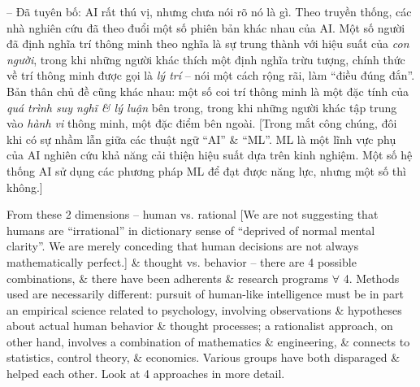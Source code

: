 \documentclass{article}
\begin{document}
\begin{itemize}
\begin{itemize}
\begin{itemize}
			-- Đã tuyên bố: AI rất thú vị, nhưng chưa nói rõ nó là gì. Theo truyền thống, các nhà nghiên cứu đã theo đuổi một số phiên bản khác nhau của AI. Một số người đã định nghĩa trí thông minh theo nghĩa là sự trung thành với hiệu suất của {\it con người}, trong khi những người khác thích một định nghĩa trừu tượng, chính thức về trí thông minh được gọi là {\it lý trí} -- nói một cách rộng rãi, làm ``điều đúng đắn''. Bản thân chủ đề cũng khác nhau: một số coi trí thông minh là một đặc tính của {\it quá trình suy nghĩ \& lý luận} bên trong, trong khi những người khác tập trung vào {\it hành vi} thông minh, một đặc điểm bên ngoài. [Trong mắt công chúng, đôi khi có sự nhầm lẫn giữa các thuật ngữ ``AI'' \& ``ML''. ML là một lĩnh vực phụ của AI nghiên cứu khả năng cải thiện hiệu suất dựa trên kinh nghiệm. Một số hệ thống AI sử dụng các phương pháp ML để đạt được năng lực, nhưng một số thì không.]
			
			From these 2 dimensions -- human vs. rational [We are not suggesting that humans are ``irrational'' in dictionary sense of ``deprived of normal mental clarity''. We are merely conceding that human decisions are not always mathematically perfect.] \& thought vs. behavior -- there are 4 possible combinations, \& there have been adherents \& research programs $\forall$ 4. Methods used are necessarily different: pursuit of human-like intelligence must be in part an empirical science related to psychology, involving observations \& hypotheses about actual human behavior \& thought processes; a rationalist approach, on other hand, involves a combination of mathematics \& engineering, \& connects to statistics, control theory, \& economics. Various groups have both disparaged \& helped each other. Look at 4 approaches in more detail.
			

\end{itemize}
\end{itemize}
\end{itemize}
\end{document}
